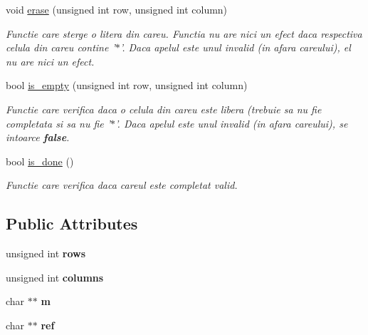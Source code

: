 \begin{DoxyCompactItemize}
void \hyperlink{classRebus_a671d4a4355f48a1dc31d82236cbd4935}{erase} (unsigned int row, unsigned int column)
\begin{DoxyCompactList}\small\item\em Functie care sterge o litera din careu. Functia nu are nici un efect daca respectiva celula din careu contine '$\ast$'. Daca apelul este unul invalid (in afara careului), el nu are nici un efect. \item\end{DoxyCompactList}\item 
bool \hyperlink{classRebus_ab91bb231fa7ee3fb81dee78829f6f249}{is\_\-empty} (unsigned int row, unsigned int column)
\begin{DoxyCompactList}\small\item\em Functie care verifica daca o celula din careu este libera (trebuie sa nu fie completata si sa nu fie '$\ast$'. Daca apelul este unul invalid (in afara careului), se intoarce {\bfseries false}. \item\end{DoxyCompactList}\item 
bool \hyperlink{classRebus_af5a546a1f074c8ed3dd744927b78a46a}{is\_\-done} ()
\begin{DoxyCompactList}\small\item\em Functie care verifica daca careul este completat valid. \item\end{DoxyCompactList}\end{DoxyCompactItemize}
\subsection*{Public Attributes}
\begin{DoxyCompactItemize}
\item 
\hypertarget{classRebus_a9365915f372e9f478fe5189c718f043f}{
unsigned int {\bfseries rows}}
\label{classRebus_a9365915f372e9f478fe5189c718f043f}

\item 
\hypertarget{classRebus_a68fdfd23dd2cd59b026e51cccd361469}{
unsigned int {\bfseries columns}}
\label{classRebus_a68fdfd23dd2cd59b026e51cccd361469}

\item 
\hypertarget{classRebus_a255a59b959732937887caafc0b8998f6}{
char $\ast$$\ast$ {\bfseries m}}
\label{classRebus_a255a59b959732937887caafc0b8998f6}

\item 
\hypertarget{classRebus_a6bd4ab40680f23f0da27dd05fa3cd420}{
char $\ast$$\ast$ {\bfseries ref}}
\label{classRebus_a6bd4ab40680f23f0da27dd05fa3cd420}

\end{DoxyCompactItemize}
